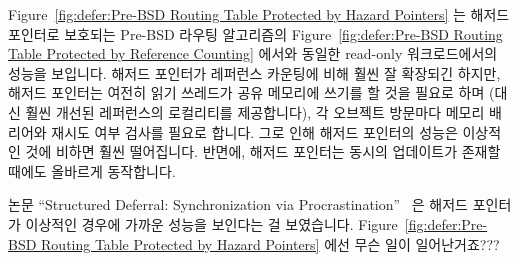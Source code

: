 Figure~\ref{fig:defer:Pre-BSD Routing Table Protected by Hazard Pointers} 는
해저드 포인터로 보호되는 Pre-BSD 라우팅 알고리즘의
Figure~\ref{fig:defer:Pre-BSD Routing Table Protected by Reference Counting}
에서와 동일한 read-only 워크로드에서의 성능을 보입니다.
해저드 포인터가 레퍼런스 카운팅에 비해 훨씬 잘 확장되긴 하지만, 해저드 포인터는
여전히 읽기 쓰레드가 공유 메모리에 쓰기를 할 것을 필요로 하며 (대신 훨씬 개선된
레퍼런스의 로컬리티를 제공합니다), 각 오브젝트 방문마다 메모리 배리어와 재시도
여부 검사를 필요로 합니다.
그로 인해 해저드 포인터의 성능은 이상적인 것에 비하면 훨씬 떨어집니다.
반면에, 해저드 포인터는 동시의 업데이트가 존재할 때에도 올바르게 동작합니다.

\QuickQuiz{}
	논문 ``Structured Deferral: Synchronization via
	Procrastination''~\cite{McKenney:2013:SDS:2483852.2483867} 은 해저드
	포인터가 이상적인 경우에 가까운 성능을 보인다는 걸 보였습니다.
	Figure~\ref{fig:defer:Pre-BSD Routing Table Protected by Hazard Pointers}
	에선 무슨 일이 일어난거죠???
	\iffalse

